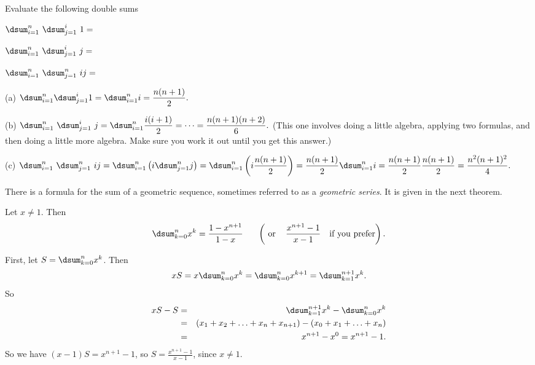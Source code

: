 \begin{exer}
Evaluate the following double sums
\begin{lenum}
\item
$\dsum _{i=1}^n \ \dsum _{j=1}^i\ 1=$

\vspace*{1.6in}
\item
$\dsum _{i=1}^n \ \dsum _{j=1}^i\ j=$

\vspace*{1.5in}
\item
$\dsum _{i=1}^n \ \dsum _{j=1}^n\ ij=$

\vspace*{2in}
\end{lenum}
\begin{answer}
(a) 
$\dsum _{i=1}^n \dsum _{j=1}^i 1 = \dsum _{i=1}^n i = \dfrac{n(n+1)}{2}.$

\noindent
(b) $\dsum _{i=1}^n \ \dsum _{j=1}^i\ j
= \dsum _{i=1}^n \dfrac{i(i+1)}{2} = \cdots = \dfrac{n(n+1)(n+2)}{6}.$
(This one involves doing a little algebra, applying two formulas, and then doing a little more
algebra.  Make sure you work it out until you get this answer.)

\noindent
(c) 
$\dsum _{i=1}^n \ \dsum _{j=1}^n\ ij=
\dsum _{i=1}^n\left( i\dsum _{j=1}^n j\right)= 
\dsum _{i=1}^n\left( i\dfrac{n(n+1)}{2}\right)= 
\dfrac{n(n+1)}{2}\dsum _{i=1}^n i= 
\dfrac{n(n+1)}{2}\dfrac{n(n+1)}{2}= 
\dfrac{n^2(n+1)^2}{4}.$
\end{answer}
\end{exer}

There is a formula for the sum of a geometric sequence, sometimes referred to as a {\em geometric series}.
It is given in the next theorem.
\begin{thm}\label{thm:geom}
Let $x\neq 1$. Then
$$\dsum _{k=0}^n x^k =\dfrac{1-x^{n+1}}{1-x} \, \, \, \, \, \, \, \, \, \, 
\left(\mbox{ or } \, \, \, \, \, \dfrac{x^{n+1}-1}{x-1}\, \, \, \, \mbox{ if you prefer}\right).$$
\label{thm:sum-finite-geom-series}
\begin{pf}
First, let $S=\dsum _{k=0}^n x^k$.
Then $$xS = x\dsum _{k=0}^n  x^k = \dsum _{k=0}^n x^{k+1}= \dsum _{k=1}^{n+1}  x^{k}.$$
So
\begin{eqnarray*}
xS - S &=&\dsum _{k=1}^{n+1} x^{k} - \dsum _{k=0}^n x^k\\
&=&(x_1+x_2+\ldots+x_n+x_{n+1}) - (x_0+x_1+\ldots+x_n)\\
&=&x^{n+1}-x^0=x^{n+1}-1.
\end{eqnarray*}
So we have $(x-1)S=x^{n+1}-1$, so $S=\frac{x^{n+1}-1}{x-1}$, since $x\neq 1$.
\end{pf}
\end{thm}

